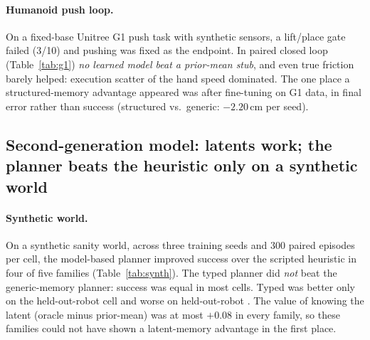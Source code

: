 \paragraph{Humanoid push loop.} On a fixed-base Unitree G1 push task with synthetic sensors, a lift/place gate
failed (3/10) and pushing was fixed as the endpoint. In paired closed loop (Table~\ref{tab:g1}) \emph{no
learned model beat a prior-mean stub}, and even true friction barely helped: execution scatter of the hand
speed dominated. The one place a structured-memory advantage appeared was after fine-tuning on G1 data, in
final error rather than success (structured vs.\ generic: $-2.20$\,cm  per seed).

\begin{table}[!htbp]
  \centering\small
  \caption{Sprint, G1 push task: paired closed-loop successes. Exploratory.}
  \label{tab:g1}
\end{table}

\subsection{Second-generation model: latents work; the planner beats the heuristic only on a synthetic world}
\label{sec:res-r4r6}

\paragraph{Synthetic world.} On a synthetic sanity world, across three training seeds and 300 paired episodes
per cell, the model-based planner improved success over the scripted heuristic in four of five families
(Table~\ref{tab:synth}). The typed planner did \emph{not} beat the generic-memory planner: success was equal
in most cells. Typed was better only on the held-out-robot  cell and worse on held-out-robot
. The value of knowing the latent (oracle minus prior-mean) was at most $+0.08$ in every family,
so these families could not have shown a latent-memory advantage in the first place.

